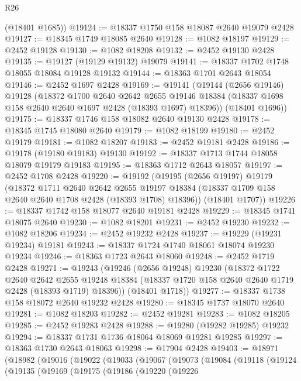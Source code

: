 \begin{lexlean}{R26}
\begin{coremodule}
      (@18401 @1685))
@19124 := @18337 @1750 @158 @18087 @2640 @19079 @2428
@19127 := @18345 @1749 @18085 @2640
@19128 := @1082 @18197
@19129 := @2452 @19128
@19130 := @1082 @18208
@19132 := @2452 @19130 @2428
@19135 := @19127 (@19129 @19132) @19079
@19141 := @18337 @1702 @1748 @18055 @18084 @19128 @19132
@19144 := @18363 @1701 @2643 @18054
@19146 := @2452 @1697 @2428
@19169 := @19141
    (@19144
      (@2656 @19146)
      @19128
      (@18372
        @1700
        @2640
        @2642
        @2655
        @19146
        @18384
        (@18337 @1698 @158 @2640 @2640 @1697 @2428 (@18393 @1697) @18396))
      (@18401 @1696))
@19175 := @18337 @1746 @158 @18082 @2640 @19130 @2428
@19178 := @18345 @1745 @18080 @2640
@19179 := @1082 @18199
@19180 := @2452 @19179
@19181 := @1082 @18207
@19183 := @2452 @19181 @2428
@19186 := @19178 (@19180 @19183) @19130
@19192 := @18337 @1713 @1744 @18058 @18079 @19179 @19183
@19195 := @18363 @1712 @2643 @18057
@19197 := @2452 @1708 @2428
@19220 := @19192
    (@19195
      (@2656 @19197)
      @19179
      (@18372
        @1711
        @2640
        @2642
        @2655
        @19197
        @18384
        (@18337 @1709 @158 @2640 @2640 @1708 @2428 (@18393 @1708) @18396))
      (@18401 @1707))
@19226 := @18337 @1742 @158 @18077 @2640 @19181 @2428
@19229 := @18345 @1741 @18075 @2640
@19230 := @1082 @18201
@19231 := @2452 @19230
@19232 := @1082 @18206
@19234 := @2452 @19232 @2428
@19237 := @19229 (@19231 @19234) @19181
@19243 := @18337 @1724 @1740 @18061 @18074 @19230 @19234
@19246 := @18363 @1723 @2643 @18060
@19248 := @2452 @1719 @2428
@19271 := @19243
    (@19246
      (@2656 @19248)
      @19230
      (@18372
        @1722
        @2640
        @2642
        @2655
        @19248
        @18384
        (@18337 @1720 @158 @2640 @2640 @1719 @2428 (@18393 @1719) @18396))
      (@18401 @1718))
@19277 := @18337 @1738 @158 @18072 @2640 @19232 @2428
@19280 := @18345 @1737 @18070 @2640
@19281 := @1082 @18203
@19282 := @2452 @19281
@19283 := @1082 @18205
@19285 := @2452 @19283 @2428
@19288 := @19280 (@19282 @19285) @19232
@19294 := @18337 @1731 @1736 @18064 @18069 @19281 @19285
@19297 := @18363 @1730 @2643 @18063
@19298 := @17904 @2428
@19403 := @18971
    (@18982
      (@19016
        (@19022
          (@19033
            (@19067
              (@19073
                (@19084
                  (@19118
                    (@19124
                      (@19135
                        (@19169
                          (@19175
                            (@19186
                              (@19220
                                (@19226

\end{coremodule}
\end{lexlean}
